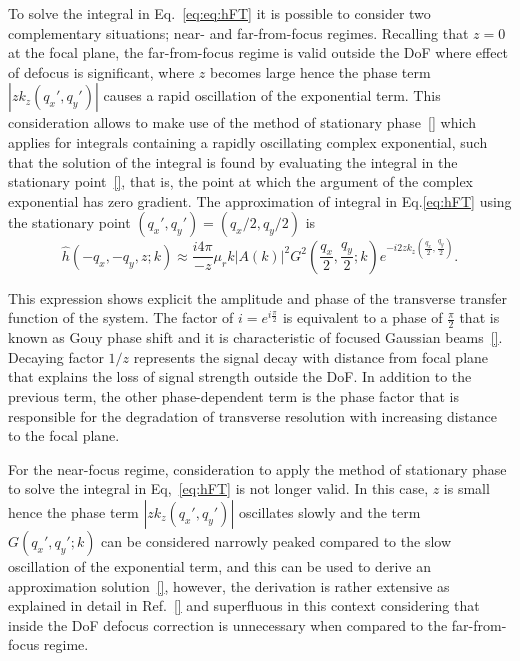 To solve the integral in Eq.~\ref{eq:eq:hFT} it is possible to consider two complementary situations; near- and far-from-focus regimes. Recalling that $z=0$ at the focal plane, the far-from-focus regime is valid outside the DoF where effect of defocus is significant, where $z$ becomes large hence the phase term $|zk_z(q_x',q_y')|$ causes a rapid oscillation of the exponential term. This consideration allows to make use of the method of stationary phase~\ref{} which applies for integrals containing a rapidly oscillating complex exponential, such that the solution of the integral is found by evaluating the integral in the stationary point~\ref{}, that is, the point at which the argument of the complex exponential has zero gradient. The approximation of integral in Eq.\ref{eq:hFT} using the stationary point $(q_x', q_y') = (q_x/2, q_y/2)$ is
\begin{equation}\label{eq:hFT_fff}
    \hat{h}(-q_x, -q_y, z; k) \approx \frac{i4\pi}{-z}\mu_rk|A(k)|^2G^2\left(\frac{q_x}{2}, \frac{q_y}{2}; k\right)e^{-i2zk_z(\frac{q_x}{2}, \frac{q_y}{2})}.
\end{equation}

This expression shows explicit the amplitude and phase of the transverse transfer function of the system. The factor of $i=e^{i\frac{\pi}{2}}$ is equivalent to a phase of $\frac{\pi}{2}$ that is known as Gouy phase shift and it is characteristic of focused Gaussian beams~\ref{}. Decaying factor $1/z$ represents the signal decay with distance from focal plane that explains the loss of signal strength outside the DoF. In addition to the previous term, the other phase-dependent term is the phase factor that is responsible for the degradation of transverse resolution with increasing distance to the focal plane.

For the near-focus regime, consideration to apply the method of stationary phase to solve the integral in Eq,~\ref{eq:hFT} is not longer valid. In this case, $z$ is small hence the phase term $|zk_z(q_x',q_y')|$ oscillates slowly and the term $G(q_x', q_y'; k)$ can be considered narrowly peaked compared to the slow oscillation of the exponential term, and this can be used to derive an approximation solution~\ref{}, however, the derivation is rather extensive as explained in detail in Ref.~\ref{} and superfluous in this context considering that inside the DoF defocus correction is unnecessary when compared to the far-from-focus regime.

